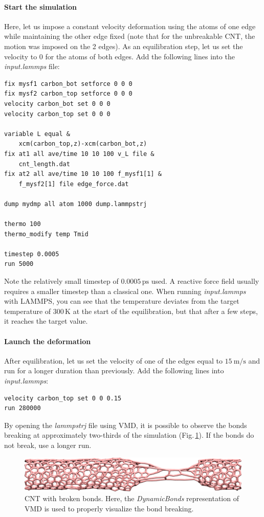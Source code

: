 \documentclass[9pt,tutorial]{livecoms}
\begin{document}
\paragraph{Start the simulation}
Here, let us impose a constant velocity deformation using the atoms of one edge while maintaining the other edge fixed (note that for the unbreakable CNT, the motion was imposed on the 2 edges). As an equilibration step, let us set the velocity to 0 for the atoms of both edges. Add the following lines into the \textit{input.lammps} file:
{\normalsize \begin{verbatim}
fix mysf1 carbon_bot setforce 0 0 0
fix mysf2 carbon_top setforce 0 0 0
velocity carbon_bot set 0 0 0
velocity carbon_top set 0 0 0

variable L equal &
    xcm(carbon_top,z)-xcm(carbon_bot,z)
fix at1 all ave/time 10 10 100 v_L file &
    cnt_length.dat
fix at2 all ave/time 10 10 100 f_mysf1[1] &
    f_mysf2[1] file edge_force.dat

dump mydmp all atom 1000 dump.lammpstrj

thermo 100
thermo_modify temp Tmid

timestep 0.0005
run 5000
\end{verbatim}}
Note the relatively small timestep of $0.0005\,\text{ps}$ used. A reactive force field usually requires a smaller timestep than a classical one. When running \textit{input.lammps} with LAMMPS, you can see that the temperature deviates from the target temperature of $300\,\text{K}$ at the start of the equilibration, but that after a few steps, it reaches the target value.

\paragraph{Launch the deformation}
After equilibration, let us set the velocity of one of the edges equal to $15~\text{m/s}$ and run for a longer duration than previously. Add the following lines into \textit{input.lammps}:
{\normalsize \begin{verbatim}
velocity carbon_top set 0 0 0.15
run 280000
\end{verbatim}}
By opening the \textit{lammpstrj} file using VMD, it is possible to observe the bonds breaking at approximately two-thirds of the simulation (Fig.\,\ref{fig:CNT-deformed-breakable}). If the bonds do not break, use a longer run. 

\begin{figure}
\centering
\includegraphics[width=\linewidth]{CNT-deformed-breakable}
\caption{CNT with broken bonds. Here, the \textit{DynamicBonds} representation of VMD is used to properly visualize the bond breaking.}
\label{fig:CNT-deformed-breakable}
\end{figure}
\end{document}

